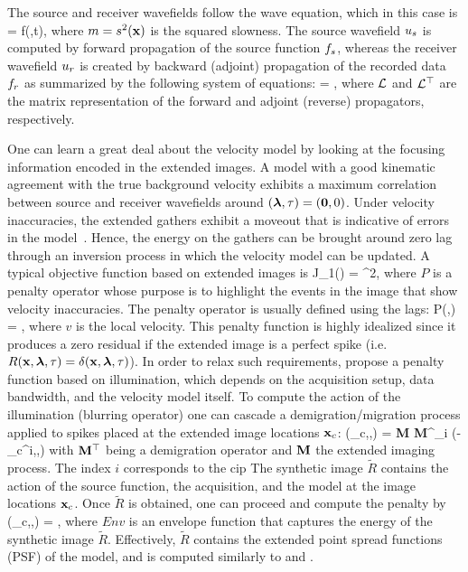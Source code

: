 The source and receiver wavefields follow the wave equation, which in this case
is 
\beq
   = f(\xx,t),
\label{eq:we}
\eeq
where $m=s^2({\bf x})$ is the squared slowness. The source wavefield $u_s$ is computed by forward
propagation of the source function ${f_s}$, whereas the receiver wavefield $u_r$ is created by backward (adjoint)
propagation of the recorded data ${f_r}$ as summarized by the following system of equations:
\beq \label{eqn:FSV}
\MAT{ \us \\ \ur} =
\MAT{ \fs \\ \fr} ,
\eeq
where $\mathcal{L}$ and $\mathcal{L}^\top$ are the matrix representation of the forward and adjoint (reverse) propagators, respectively. 

One can learn a great deal about the velocity model by looking at the focusing information
encoded in the extended images. A model with a good kinematic agreement with 
the true background velocity exhibits 
a maximum correlation between source and receiver wavefields around $({\boldsymbol{\lambda}},\tau)=({\bf 0},0)$. Under velocity 
inaccuracies, the
extended gathers exhibit a moveout that is indicative of 
 errors in the model~\citep{YangSava:moveout}. Hence,
 the energy on the gathers can be brought around zero lag through an
inversion process in which the velocity model can be updated. A typical 
objective function \citep{ShenSymes.geo.2008,Wiktor,tony:gp15} based on 
extended images is 
\beq
 J_1(\m) = ^2,
\eeq
where $P$ is a penalty operator whose purpose is to 
highlight the events in the image that show velocity inaccuracies. 
 The penalty operator is usually defined using the lags:
\beq
  P(\hh,\tau) = ,
\eeq
where $v$ is the local velocity. This penalty function is 
highly idealized since it produces a zero residual if the 
extended image is a perfect spike (i.e. $R({\bf x},{\boldsymbol{\lambda}},\tau)=\delta({\bf x},{\boldsymbol{\lambda}},\tau)$).
 In order to relax such requirements, \cite{tony_seg:cwp12} propose
a penalty function based on illumination, which depends on the 
acquisition setup, data bandwidth, and the velocity model itself. 
 To compute the action of the illumination (blurring  
operator) one can cascade a demigration/migration process 
applied to spikes placed at the extended image locations ${\bf x}_c$:
\beq
  (\xx_c,\hh,\tau) = {\bf M} {\bf M}^\top \sum_{i} \delta(\xx-\xx_c^i,\hh,\tau)
\eeq
with $\bf M^\top$ being a demigration operator and $\bf M$ the extended imaging process. The index
$i$ corresponds to the cip
 The synthetic image $\tilde{R}$ contains the action of the source function, the acquisition, 
and the model at the image locations ${\bf x}_c$. Once $\tilde{R}$ is obtained, one can 
proceed and compute the penalty by 
\beq
  (\xx_c,\hh,\tau) = ,
\eeq
where $Env$ is an envelope function that captures the energy of the synthetic  
image $\tilde{R}$.
Effectively, $\tilde{R}$ contains the extended point spread functions (PSF) of the model, 
and is computed similarly to \cite{valenciano:2009} and \cite{FletcherLSM}.



